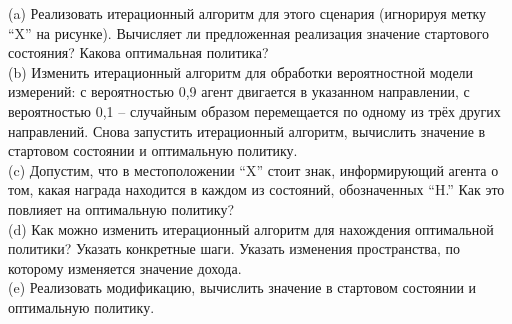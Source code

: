 \documentclass[10pt,a4paper]{article}
\begin{document}
(a)	Реализовать итерационный алгоритм для этого сценария (игнорируя метку “X” на рисунке). Вычисляет ли предложенная реализация значение стартового состояния? Какова оптимальная политика?\\

(b)	Изменить итерационный алгоритм для обработки вероятностной модели измерений: с вероятностью 0,9 агент двигается в указанном направлении, с вероятностью 0,1 – случайным образом перемещается по одному из трёх других направлений. Снова запустить итерационный алгоритм, вычислить значение в стартовом состоянии и оптимальную политику.\\

(c)	Допустим, что в местоположении “X” стоит знак, информирующий агента о том, какая награда находится в каждом из состояний, обозначенных “H.” Как это повлияет на оптимальную политику?\\

(d)	Как можно изменить итерационный алгоритм для нахождения оптимальной политики? Указать конкретные шаги. Указать изменения пространства, по которому изменяется значение дохода.\\

(e)	Реализовать модификацию, вычислить значение в стартовом состоянии и оптимальную политику.\\



 
\end{document}
